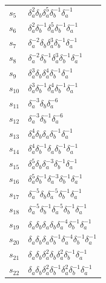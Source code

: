 \documentclass{article}
\begin{document}
\begin{center}
\begin{tabular}{ll}
$s_{5}$ & $\delta_a^{2}\delta_b^{}\delta_a^{5}\delta_b^{-1}\delta_a^{-1}$ \\
$s_{6}$ & $\delta_a^{2}\delta_b^{-1}\delta_a^{5}\delta_b^{-1}\delta_a^{-1}$ \\
$s_{7}$ & $\delta_a^{-2}\delta_b^{}\delta_a^{3}\delta_b^{-1}\delta_a^{-1}$ \\
$s_{8}$ & $\delta_a^{-2}\delta_b^{-1}\delta_a^{3}\delta_b^{-1}\delta_a^{-1}$ \\
$s_{9}$ & $\delta_a^{3}\delta_b^{}\delta_a^{4}\delta_b^{-1}\delta_a^{-1}$ \\
$s_{10}$ & $\delta_a^{3}\delta_b^{-1}\delta_a^{4}\delta_b^{-1}\delta_a^{-1}$ \\
$s_{11}$ & $\delta_a^{-3}\delta_b^{}\delta_a^{-6}$ \\
$s_{12}$ & $\delta_a^{-3}\delta_b^{-1}\delta_a^{-6}$ \\
$s_{13}$ & $\delta_a^{4}\delta_b^{}\delta_a^{}\delta_b^{-1}\delta_a^{-1}$ \\
$s_{14}$ & $\delta_a^{4}\delta_b^{-1}\delta_a^{}\delta_b^{-1}\delta_a^{-1}$ \\
$s_{15}$ & $\delta_a^{5}\delta_b^{}\delta_a^{-3}\delta_b^{-1}\delta_a^{-1}$ \\
$s_{16}$ & $\delta_a^{5}\delta_b^{-1}\delta_a^{-3}\delta_b^{-1}\delta_a^{-1}$ \\
$s_{17}$ & $\delta_a^{-5}\delta_b^{}\delta_a^{-5}\delta_b^{-1}\delta_a^{-1}$ \\
$s_{18}$ & $\delta_a^{-5}\delta_b^{-1}\delta_a^{-5}\delta_b^{-1}\delta_a^{-1}$ \\
$s_{19}$ & $\delta_a^{}\delta_b^{}\delta_a^{}\delta_b^{}\delta_a^{-4}\delta_b^{-1}\delta_a^{-1}$ \\
$s_{20}$ & $\delta_a^{}\delta_b^{}\delta_a^{}\delta_b^{-1}\delta_a^{-4}\delta_b^{-1}\delta_a^{-1}$ \\
$s_{21}$ & $\delta_a^{}\delta_b^{}\delta_a^{2}\delta_b^{}\delta_a^{2}\delta_b^{-1}\delta_a^{-1}$ \\
$s_{22}$ & $\delta_a^{}\delta_b^{}\delta_a^{2}\delta_b^{-1}\delta_a^{2}\delta_b^{-1}\delta_a^{-1}$ \\
\bottomrule
\end{tabular}
\end{center}

\thispagestyle{empty}
\end{document}
